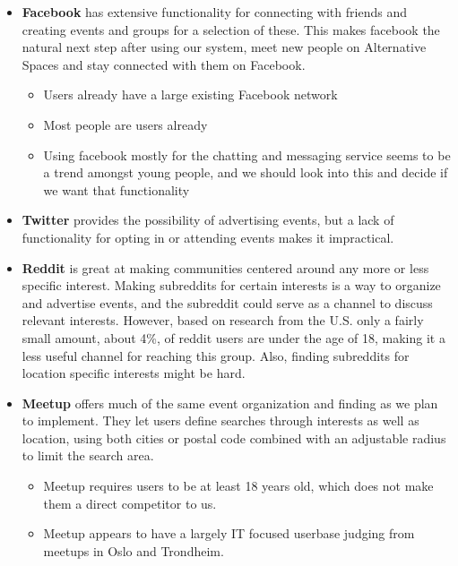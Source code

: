 \begin{itemize}
  \item \textbf{Facebook} has extensive functionality for connecting with friends and creating events and groups for a selection of these. This makes facebook the natural next step after using our system, meet new people on Alternative Spaces and stay connected with them on Facebook. \begin{itemize}
    \item Users already have a large existing Facebook network
    \item Most people are users already
    \item Using facebook mostly for the chatting and messaging service seems to be a trend amongst young people, and we should look into this and decide if we want that functionality
  \end{itemize}
  \item \textbf{Twitter} provides the possibility of advertising events, but a lack of functionality for opting in or attending events makes it impractical.
  \item \textbf{Reddit}  is great at making communities centered around any more or less specific interest. Making subreddits for certain interests is a way to organize and advertise events, and the subreddit could serve as a channel to discuss relevant interests. However, based on research from the U.S. only a fairly small amount, about 4\%, of reddit users are under the age of 18, making it a less useful channel for reaching this group. Also, finding subreddits for location specific interests might be hard.
  \item \textbf{Meetup} offers much of the same event organization and finding as we plan to implement. They let users define searches through interests as well as location, using both cities or postal code combined with an adjustable radius to limit the search area. \begin{itemize}
    \item Meetup requires users to be at least 18 years old, which does not make them a direct competitor to us.
    \item Meetup appears to have a largely IT focused userbase judging from meetups in Oslo and Trondheim.
  \end{itemize}
\end{itemize}

